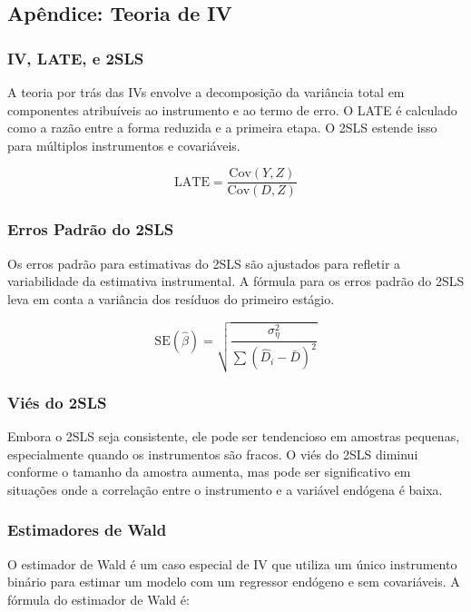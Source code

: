 \documentclass[a4paper,12pt]{article}[abntex2]
\begin{document}
\subsection*{Apêndice: Teoria de IV}

\subsubsection*{IV, LATE, e 2SLS}

A teoria por trás das IVs envolve a decomposição da variância total em componentes atribuíveis ao instrumento e ao termo de erro. O LATE é calculado como a razão entre a forma reduzida e a primeira etapa. O 2SLS estende isso para múltiplos instrumentos e covariáveis.

\begin{equation}
    \text{LATE} = \frac{\text{Cov}(Y, Z)}{\text{Cov}(D, Z)}
\end{equation}

\subsubsection*{Erros Padrão do 2SLS}

Os erros padrão para estimativas do 2SLS são ajustados para refletir a variabilidade da estimativa instrumental. A fórmula para os erros padrão do 2SLS leva em conta a variância dos resíduos do primeiro estágio.

\begin{equation}
    \text{SE}(\hat{\beta}) = \sqrt{\frac{\sigma_\eta^2}{\sum (\hat{D}_i - \bar{D})^2}}
\end{equation}

\subsubsection*{Viés do 2SLS}

Embora o 2SLS seja consistente, ele pode ser tendencioso em amostras pequenas, especialmente quando os instrumentos são fracos. O viés do 2SLS diminui conforme o tamanho da amostra aumenta, mas pode ser significativo em situações onde a correlação entre o instrumento e a variável endógena é baixa.

\subsubsection*{Estimadores de Wald}

O estimador de Wald é um caso especial de IV que utiliza um único instrumento binário para estimar um modelo com um regressor endógeno e sem covariáveis. A fórmula do estimador de Wald é:
\end{document}
